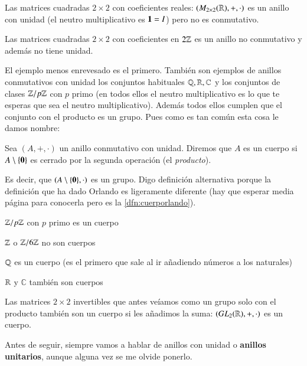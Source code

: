 \begin{ej}
	Las matrices cuadradas $2\times 2$ con coeficientes reales: $(M_{2\times 2}(\mathbb{R}), +, \cdot)$ es un anillo con unidad (el neutro multiplicativo es $\mathbf{1} = I$) pero no es conmutativo.
\end{ej}

\begin{ej}
	Las matrices cuadradas $2\times 2$ con coeficientes en $2\mathbb{Z}$ es un anillo no conmutativo y además no tiene unidad.
\end{ej}

El ejemplo menos enrevesado es el primero. También son ejemplos de anillos conmutativos con unidad los conjuntos habituales $\mathbb{Q}, \mathbb{R}, \mathbb{C}$ y los conjuntos de clases $\mathbb{Z}/p\mathbb{Z}$ con $p$ primo (en todos ellos el neutro multiplicativo es lo que te esperas que sea el neutro multiplicativo). Además todos ellos cumplen que el conjunto con el producto es un grupo. Pues como es tan común esta cosa le damos nombre:

\begin{dfn}
	Sea $(A, +, \cdot)$ un anillo conmutativo con unidad. Diremos que $A$ es un cuerpo si $A\setminus \{\mathbf{0}\}$ es cerrado por la segunda operación (el \textit{producto}).
\end{dfn}

Es decir, que $(A\setminus\{\mathbf{0}\}, \cdot)$ es un grupo. Digo definición alternativa porque la definición que ha dado Orlando es ligeramente diferente (hay que esperar media página para conocerla pero es la \autoref{dfn:cuerporlando}).

\begin{ej}
	\item $\mathbb{Z}/p\mathbb{Z}$ con $p$ primo es un cuerpo
	\item $\mathbb{Z}$ o $\mathbb{Z}/6\mathbb{Z}$ no son cuerpos
	\item $\mathbb{Q}$ es un cuerpo (es el primero que sale al ir añadiendo números a los naturales)
	\item $\mathbb{R}$ y $\mathbb{C}$ también son cuerpos
	\item Las matrices $2 \times 2$ invertibles que antes veíamos como un grupo solo con el producto también son un cuerpo si les añadimos la suma: $(GL_2(\mathbb{R}), +, \cdot)$ es un cuerpo.
\end{ej}

Antes de seguir, siempre vamos a hablar de anillos con unidad o \textbf{anillos unitarios}, aunque alguna vez se me olvide ponerlo.

